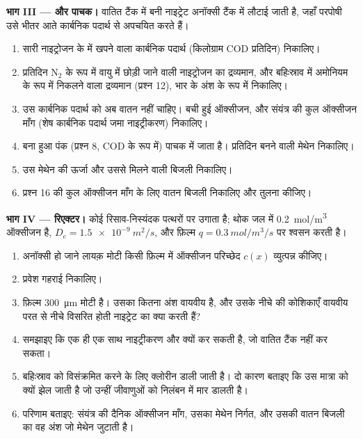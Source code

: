 \begin{problem}
\medskip
\noindent\textbf{भाग III ---  और पाचक।}
वातित टैंक में बनी नाइट्रेट अनॉक्सी टैंक में लौटाई जाती है, जहाँ
परपोषी उसे भीतर आते कार्बनिक पदार्थ से अपचयित करते हैं।
\begin{enumerate}[resume]
  \item सारी नाइट्रोजन के  में खपने वाला कार्बनिक पदार्थ
        (किलोग्राम COD प्रतिदिन) निकालिए।
  \item प्रतिदिन $\mathrm{N_2}$ के रूप में वायु में छोड़ी जाने वाली
        नाइट्रोजन का द्रव्यमान, और बहिःस्राव में अमोनियम के रूप में
        निकलने वाला द्रव्यमान (प्रश्न 12), भार के अंश के रूप में
        निकालिए।
  \item उस कार्बनिक पदार्थ को अब वातन नहीं चाहिए। बची हुई ऑक्सीजन, और
        संयंत्र की कुल ऑक्सीजन माँग (शेष कार्बनिक पदार्थ जमा
        नाइट्रीकरण) निकालिए।
  \item बना हुआ पंक (प्रश्न 8, COD के रूप में) पाचक में जाता है।
        प्रतिदिन बनने वाली मेथेन निकालिए।
  \item उस मेथेन की ऊर्जा और उससे मिलने वाली बिजली निकालिए।
  \item प्रश्न 16 की कुल ऑक्सीजन माँग के लिए वातन बिजली निकालिए और
        तुलना कीजिए।
\end{enumerate}

\medskip
\noindent\textbf{भाग IV ---  रिएक्टर।}
कोई रिसाव-निस्यंदक पत्थरों पर  उगाता है; थोक जल में
\qty{0.2}{mol/m^3} ऑक्सीजन है, $D_e = \qty{1.5e-9}{m^2/s}$, और फ़िल्म
$q = \qty{0.3}{mol/m^3/s}$ पर श्वसन करती है।
\begin{enumerate}[resume]
  \item अनॉक्सी हो जाने लायक़ मोटी किसी फ़िल्म में ऑक्सीजन परिच्छेद
        $c(x)$ व्युत्पन्न कीजिए।
  \item प्रवेश गहराई निकालिए।
  \item फ़िल्म \qty{300}{\micro m} मोटी है। उसका कितना अंश वायवीय है,
        और उसके नीचे की कोशिकाएँ वायवीय परत से नीचे विसरित होती
        नाइट्रेट का क्या करती हैं?
  \item समझाइए कि एक ही  एक साथ नाइट्रीकरण और 
        क्यों कर सकती है, जो वातित टैंक नहीं कर सकता।
  \item बहिःस्राव को विसंक्रमित करने के लिए क्लोरीन डाली जाती है। दो
        कारण बताइए कि  उस मात्रा को क्यों झेल जाती है जो उन्हीं
        जीवाणुओं को निलंबन में मार डालती है।
  \item परिणाम बताइए: संयंत्र की दैनिक ऑक्सीजन माँग, उसका मेथेन
        निर्गत, और उसकी वातन बिजली का वह अंश जो मेथेन जुटाती है।
\end{enumerate}
\end{problem}
